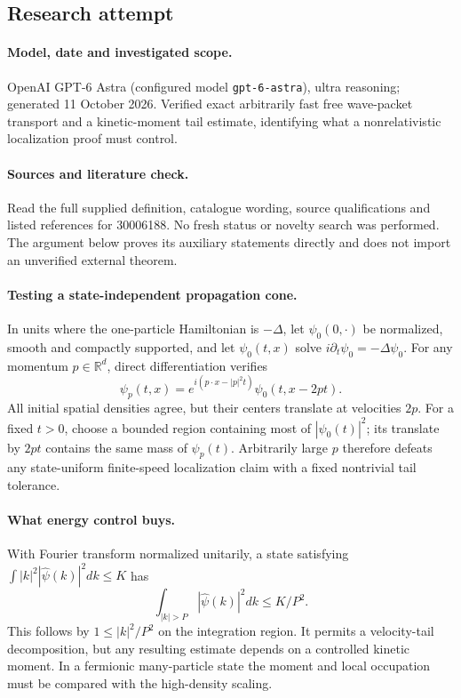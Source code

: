 \documentclass[11pt]{article}
\begin{document}
\subsection{Research attempt}
\paragraph{Model, date and investigated scope.}
OpenAI GPT-6 Astra (configured model \texttt{gpt-6-astra}), ultra reasoning; generated 11 October 2026. Verified exact arbitrarily fast free wave-packet transport and a kinetic-moment tail estimate, identifying what a nonrelativistic localization proof must control.

\paragraph{Sources and literature check.}
Read the full supplied definition, catalogue wording, source qualifications and listed references for 30006188. No fresh status or novelty search was performed. The argument below proves its auxiliary statements directly and does not import an unverified external theorem.

\paragraph{Testing a state-independent propagation cone.} In units where the one-particle Hamiltonian is \(-\Delta\), let \(\psi_0(0,\cdot)\) be normalized, smooth and compactly supported, and let \(\psi_0(t,x)\) solve \(i\partial_t\psi_0=-\Delta\psi_0\). For any momentum \(p\in\mathbb R^d\), direct differentiation verifies
\[
 \psi_p(t,x)=e^{i(p\cdot x-|p|^2t)}\psi_0(t,x-2pt).
\]
All initial spatial densities agree, but their centers translate at velocities \(2p\). For a fixed \(t>0\), choose a bounded region containing most of \(|\psi_0(t)|^2\); its translate by \(2pt\) contains the same mass of \(\psi_p(t)\). Arbitrarily large \(p\) therefore defeats any state-uniform finite-speed localization claim with a fixed nontrivial tail tolerance.
\paragraph{What energy control buys.} With Fourier transform normalized unitarily, a state satisfying \(\int |k|^2|\widehat\psi(k)|^2dk\leq K\) has
\[
 \int_{|k|>P}|\widehat\psi(k)|^2dk\leq K/P^2.
\]
This follows by \(1\leq |k|^2/P^2\) on the integration region. It permits a velocity-tail decomposition, but any resulting estimate depends on a controlled kinetic moment. In a fermionic many-particle state the moment and local occupation must be compared with the high-density scaling.
\end{document}
